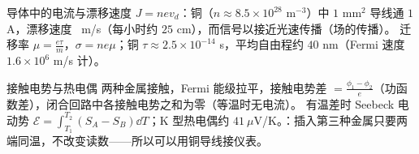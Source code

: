 \begin{结论}{导体中的电流与漂移速度}
$J=nev_d$：铜（$n\approx8.5\times10^{28}$ m$^{-3}$）中 $1$ mm$^2$ 导线通 $1$ A，漂移速度 \ m/s（每小时约 $25$ cm），而信号以接近光速传播（场的传播）。
迁移率 $\mu=\frac{e\tau}{m}$，$\sigma=ne\mu$；铜 $\tau\approx2.5\times10^{-14}$ s，平均自由程约 $40$ nm（Fermi 速度 $1.6\times10^6$ m/s 计）。
\end{结论}

\begin{结论}{接触电势与热电偶}
两种金属接触，Fermi 能级拉平，接触电势差 $=\frac{\phi_1-\phi_2}e$（功函数差），闭合回路中各接触电势之和为零（等温时无电流）。
有温差时 Seebeck 电动势 $\mathcal E=\int_{T_1}^{T_2}(S_A-S_B)\dd T$；K 型热电偶约 $41\ \mu$V/K。：插入第三种金属只要两端同温，不改变读数——所以可以用铜导线接仪表。
\end{结论}

